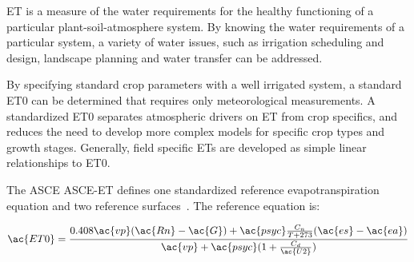 \documentclass[reviewcopy]{elsart}
\begin{document}

\ac{ET} is a measure of the water requirements for the healthy
functioning of a particular plant-soil-atmosphere system. By knowing
the water requirements of a particular system, a variety of water
issues, such as irrigation scheduling and design, landscape planning
and water transfer can be addressed.




By specifying standard crop parameters with a well irrigated
system, a standard \ac{ET0} can be determined that requires only
meteorological measurements.  A standardized \ac{ET0} separates
atmospheric drivers on \ac{ET} from crop specifics, and reduces the
need to develop more complex models for specific crop types and growth
stages.  Generally, field specific \acp{ET} are developed as simple
linear relationships to \ac{ET0}.

The \ac{ASCE} \ac{ASCE-ET} defines one standardized reference
evapotranspiration equation and two reference
surfaces~\citep{walter00stand-refer}.  The reference equation is:

\begin{equation}
  \ac{ET0} = \frac{0.408 \ac{vp} (\ac{Rn} - \ac{G}) +
    \ac{psyc}\frac{C_n}{T+273}(\ac{es} - \ac{ea})}{\ac{vp} + \ac{psyc} (1 +
    \frac{C_d}{\ac{U2}})} \label{eq:asce-et0}
\end{equation}
\end{document}
